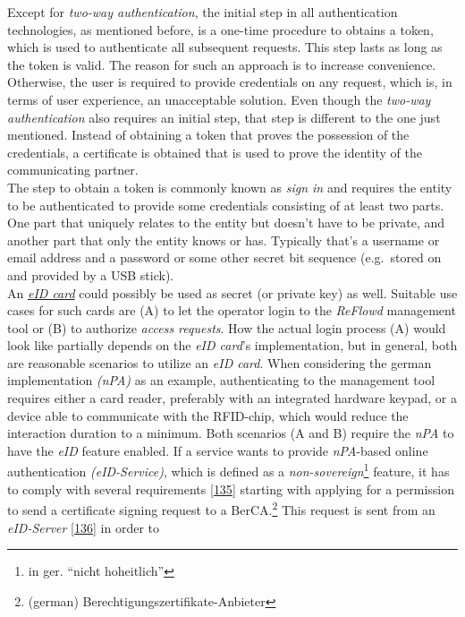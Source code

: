 \documentclass[12pt,english,a4paper,titlepage,cleardoublepage=empty,dottedtoc]{report}
\begin{document}
Except for \emph{two-way authentication}, the initial step in all
authentication technologies, as mentioned before, is a one-time
procedure to obtains a token, which is used to authenticate all
subsequent requests. This step lasts as long as the token is valid. The
reason for such an approach is to increase convenience. Otherwise, the
user is required to provide credentials on any request, which is, in
terms of user experience, an unacceptable solution. Even though the
\emph{two-way authentication} also requires an initial step, that step
is different to the one just mentioned. Instead of obtaining a token
that proves the possession of the credentials, a certificate is obtained
that is used to prove the identity of the communicating partner.\\
The step to obtain a token is commonly known as \emph{sign in} and
requires the entity to be authenticated to provide some credentials
consisting of at least two parts. One part that uniquely relates to the
entity but doesn't have to be private, and another part that only the
entity knows or has. Typically that's a username or email address and a
password or some other secret bit sequence (e.g.~stored on and provided
by a USB stick).\\
An \emph{\protect\hyperlink{def--eid-card}{eID card}} could possibly be
used as secret (or private key) as well. Suitable use cases for such
cards are (A) to let the operator login to the \emph{ReFlowd} management
tool or (B) to authorize \emph{access requests}. How the actual login
process (A) would look like partially depends on the \emph{eID card}'s
implementation, but in general, both are reasonable scenarios to utilize
an \emph{eID card}. When considering the german implementation
\emph{(nPA)} as an example, authenticating to the management tool
requires either a card reader, preferably with an integrated hardware
keypad, or a device able to communicate with the RFID-chip, which would
reduce the interaction duration to a minimum. Both scenarios (A and B)
require the \emph{nPA} to have the \emph{eID} feature enabled. If a
service wants to provide \emph{nPA}-based online authentication
\emph{(eID-Service)}, which is defined as a
\emph{non-sovereign}\footnote{in ger. ``nicht hoheitlich''} feature, it
has to comply with several requirements
{[}\protect\hyperlink{ref-web_bsi-spec_eid}{135}{]} starting with
applying for a permission to send a certificate signing request to a
BerCA.\footnote{(german) Berechtigungszertifikate-Anbieter} This request
is sent from an \emph{eID-Server}
{[}\protect\hyperlink{ref-web_2017_npa-eid-server}{136}{]} in order to
\end{document}
